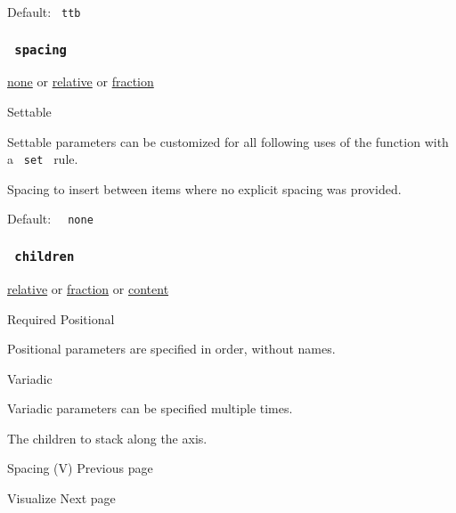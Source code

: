 Default: \texttt{\ ttb\ }

\subsubsection{\texorpdfstring{\texttt{\ spacing\ }}{ spacing }}\label{parameters-spacing}

\href{/docs/reference/foundations/none/}{none} {or}
\href{/docs/reference/layout/relative/}{relative} {or}
\href{/docs/reference/layout/fraction/}{fraction}

{{ Settable }}

\label{parameters-spacing-settable-tooltip}
Settable parameters can be customized for all following uses of the
function with a \texttt{\ set\ } rule.

Spacing to insert between items where no explicit spacing was provided.

Default: \texttt{\ }{\texttt{\ none\ }}\texttt{\ }

\subsubsection{\texorpdfstring{\texttt{\ children\ }}{ children }}\label{parameters-children}

\href{/docs/reference/layout/relative/}{relative} {or}
\href{/docs/reference/layout/fraction/}{fraction} {or}
\href{/docs/reference/foundations/content/}{content}

{Required} {{ Positional }}

\label{parameters-children-positional-tooltip}
Positional parameters are specified in order, without names.

{{ Variadic }}

\label{parameters-children-variadic-tooltip}
Variadic parameters can be specified multiple times.

The children to stack along the axis.

\href{/docs/reference/layout/v/}{\pandocbounded{}}

{ Spacing (V) } { Previous page }

\href{/docs/reference/visualize/}{\pandocbounded{}}

{ Visualize } { Next page }
